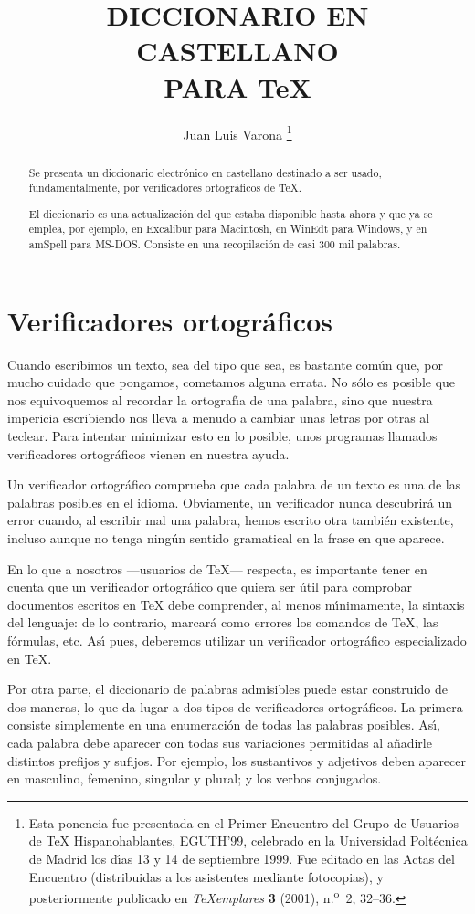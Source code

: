 \documentclass[a4paper,12pt]{article}
\date{}
\title{DICCIONARIO EN CASTELLANO\\ PARA \TeX}
\author{Juan Luis Varona%
\renewcommand\thefootnote{}
\renewcommand\footnotemark{}
\footnote{Esta ponencia fue presentada en el
Primer Encuentro del Grupo de Usuarios de TeX Hispanohablantes,
EGUTH'99, celebrado en la Universidad Polt\'ecnica de Madrid
los d\'{\i}as 13 y 14 de septiembre 1999.
Fue editado en las Actas del Encuentro (distribuidas a los
asistentes mediante fotocopias), y posteriormente publicado en
\textit{TeXemplares} \textbf{3} (2001), n.\textsuperscript{o}~2,
32--36.}
}
\begin{document}
\maketitle

\begin{abstract}
Se presenta un diccionario electr\'onico en castellano destinado a
ser usado, fundamentalmente, por verificadores ortogr\'aficos de \TeX.

El diccionario es una actualizaci\'on del que estaba disponible
hasta ahora y que ya se emplea, por ejemplo, en Excalibur para
Macintosh, en WinEdt para Windows, y en amSpell para MS-DOS.
Consiste en una recopilaci\'on de casi 300 mil palabras.
\end{abstract}

\section{Verificadores ortogr\'aficos}

Cuando escribimos un texto, sea del tipo que sea, es bastante com\'un que, por
mucho cuidado que pongamos, cometamos alguna errata. No s\'olo es posible que
nos equivoquemos al recordar la ortograf\'{\i}a de una palabra, sino que
nuestra impericia escribiendo nos lleva a menudo a cambiar unas letras por otras
al teclear. Para intentar minimizar esto en lo posible, unos programas llamados
verificadores ortogr\'aficos vienen en nuestra ayuda.

Un verificador ortogr\'afico comprueba que cada palabra de un texto es una de
las palabras posibles en el idioma. Obviamente, un verificador nunca
descubrir\'a un error cuando, al escribir mal una palabra, hemos escrito otra
tambi\'en existente, incluso aunque no tenga ning\'un sentido gramatical en la
frase en que aparece.

En lo que a nosotros ---usuarios de \TeX--- respecta, es importante tener en
cuenta que un verificador ortogr\'afico que quiera ser \'util para comprobar
documentos escritos en \TeX{} debe comprender, al menos m\'{\i}nimamente, la
sintaxis del lenguaje: de lo contrario, marcar\'a como errores los comandos de
\TeX, las f\'ormulas, etc. As\'{\i} pues, deberemos utilizar un verificador
ortogr\'afico especializado en \TeX.

Por otra parte, el diccionario de palabras admisibles puede estar construido
de dos maneras, lo que da lugar a dos tipos de verificadores ortogr\'aficos. La
primera consiste simplemente en una enumeraci\'on de todas las palabras
posibles. As\'{\i}, cada palabra debe aparecer con todas sus variaciones
permitidas al a\~nadirle distintos prefijos y sufijos. Por ejemplo, los
sustantivos y adjetivos deben aparecer en masculino, femenino, singular y
plural; y los verbos conjugados.
\end{document}
